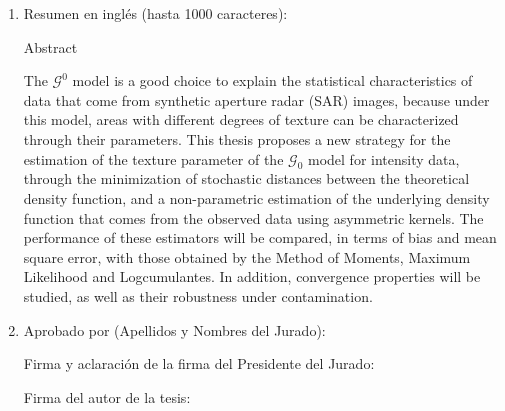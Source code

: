 \begin{enumerate}
	\item Resumen en inglés (hasta 1000 caracteres):
	
	Abstract
	
	The $\mathcal{G}^0$ model is a good choice to explain the statistical characteristics of data that come from synthetic aperture radar (SAR) images, because under this model, areas with different degrees of texture can be characterized through their parameters. This thesis proposes a new strategy for the estimation of the texture parameter of the $\mathcal G_0 $ model for intensity data, through the minimization of stochastic distances between the theoretical density function, and a non-parametric estimation of the underlying density function that comes from the observed data using asymmetric kernels. The performance of these estimators will be compared, in terms of bias and mean square error, with those obtained by the Method of Moments, Maximum Likelihood and Logcumulantes. In addition, convergence properties will be studied, as well as their robustness under contamination.

\item Aprobado por (Apellidos y Nombres del Jurado):

\bigskip\bigskip\bigskip\bigskip

Firma y aclaración de la firma del Presidente del Jurado:				

\bigskip\bigskip\bigskip\bigskip

Firma del autor de la tesis:

\end{enumerate}

\newpage
	
